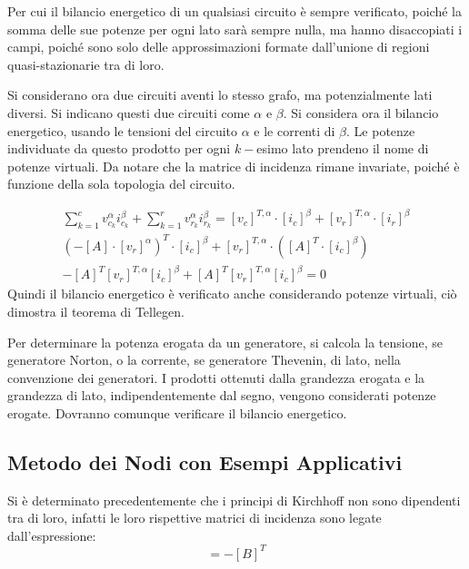 \documentclass{article}
\numberwithin{equation}{subsection}
\begin{document}
Per cui il bilancio energetico di un qualsiasi circuito è sempre verificato, poiché la somma delle sue potenze per ogni lato sarà sempre nulla, ma hanno disaccopiati 
i campi, poiché sono solo delle approssimazioni formate dall'unione di regioni quasi-stazionarie tra di loro. 

Si considerano ora due circuiti aventi lo stesso grafo, ma potenzialmente lati diversi. Si indicano questi due circuiti come $\alpha$ e $\beta$. Si considera ora il 
bilancio energetico, usando le tensioni del circuito $\alpha$ e le correnti di $\beta$. Le potenze individuate da questo prodotto per ogni $k-$esimo lato prendeno il nome 
di potenze virtuali. Da notare che la matrice di incidenza rimane invariate, poiché è funzione della sola topologia del circuito. 

\begin{gather*}
    \displaystyle\sum_{k=1}^cv_{c_k}^\alpha i_{c_k}^\beta+\sum_{k=1}^rv_{r_k}^\alpha i_{r_k}^\beta=[v_c]^{T,\alpha}\cdot[i_c]^\beta+[v_r]^{T,\alpha}\cdot[i_r]^\beta\\
    \left(-[A]\cdot[v_r]^\alpha\right)^T\cdot[i_c]^\beta+[v_r]^{T,\alpha}\cdot\left([A]^T\cdot[i_c]^\beta\right)\\
    -[A]^T[v_r]^{T,\alpha}[i_c]^\beta+[A]^T[v_r]^{T,\alpha}[i_c]^\beta=0
\end{gather*}
Quindi il bilancio energetico è verificato anche considerando potenze virtuali, ciò dimostra il teorema di Tellegen. 


Per determinare la potenza erogata da un generatore, si calcola la tensione, se generatore Norton, o la corrente, se generatore Thevenin, di lato, nella convenzione dei 
generatori. I prodotti ottenuti dalla grandezza erogata e la grandezza di lato, indipendentemente dal segno, vengono considerati potenze erogate. Dovranno comunque 
verificare il bilancio energetico. 


\subsection{Metodo dei Nodi con Esempi Applicativi}

Si è determinato precedentemente che i principi di Kirchhoff non sono dipendenti tra di loro, infatti le loro rispettive matrici di incidenza sono legate dall'espressione:
\begin{equation*}
    [A]=-[B]^T
\end{equation*}
\end{document}

